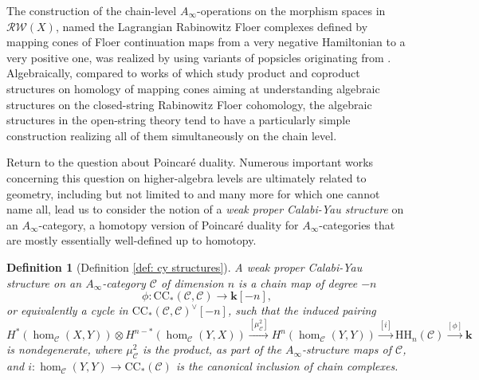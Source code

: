 \documentclass[11pt]{amsproc}
\def\K{{\mathbf{k}}}
\def\cc{\mathcal{C}}
\def\r#1{\mathrm{#1}}
\def\rw{\mathcal{RW}}
\def\ainf{A_\infty}
\newtheorem{defn}[lem]{Definition}
\theoremstyle{remark}
\numberwithin{equation}{section}
\begin{document}
The construction of the chain-level $\ainf$-operations on the morphism spaces in $\rw(X)$,
named the Lagrangian Rabinowitz Floer complexes defined by mapping cones of Floer continuation maps from a very negative Hamiltonian to a very positive one,
was realized by \cite{GGV} using variants of popsicles originating from \cite{abouzaid-seidel, seidel6}.
Algebraically, compared to works of \cites{COcone, CHOduality} which study product and coproduct structures on homology of mapping cones aiming at understanding algebraic structures on the closed-string Rabinowitz Floer cohomology,
the algebraic structures in the open-string theory tend to have a particularly simple construction realizing all of them simultaneously on the chain level.

Return to the question about Poincar\'{e} duality.
Numerous important works concerning this question on higher-algebra levels are ultimately related to geometry,
including but not limited to \cites{fukaya_cyclic, cho, tradler, tradler-zeinalian, kontsevich-soibelman} and many more for which one cannot name all,
lead us to consider the notion of a {\it weak proper Calabi-Yau structure} on an $\ainf$-category,
a homotopy version of Poincar\'{e} duality for $\ainf$-categories that are mostly essentially well-defined up to homotopy.

\begin{defn}[Definition \ref{def: cy structures}]\label{def: weak proper cy}
A weak proper Calabi-Yau structure on an $\ainf$-category $\cc$ of dimension $n$ is a chain map of degree $-n$
\begin{equation}\label{weak proper cy map}
\phi: \r{CC}_{*}(\cc, \cc) \to \K[-n],
\end{equation}
or equivalently a cycle in $\r{CC}_{*}(\cc, \cc)^{\vee}[-n]$,
such that the induced pairing
\begin{equation}\label{induced pairing}
H^{*}(\hom_{\cc}(X, Y)) \otimes H^{n-*}(\hom_{\cc}(Y, X)) \stackrel{[\mu_{\cc}^{2}]}\to H^{n}(\hom_{\cc}(Y, Y)) \stackrel{[i]}\to \r{HH}_{n}(\cc) \stackrel{[\phi]}\to \K
\end{equation}
is nondegenerate,
where $\mu_{\cc}^{2}$ is the product, as part of the $\ainf$-structure maps of $\cc$,
and $i: \hom_{\cc}(Y, Y) \to \r{CC}_{*}(\cc)$ is the canonical inclusion of chain complexes.
\end{defn}
\end{document}
